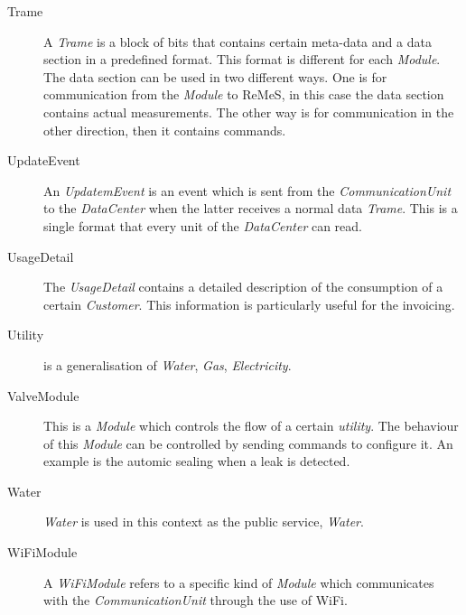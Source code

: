 \begin{description}
\item[Trame] A \emph{Trame} is a block of bits that contains certain meta-data
and a data section in a predefined format. This format is different for each
\emph{Module}. The data section can be used in two different ways. One is for
communication from the \emph{Module} to ReMeS, in this case the data section
contains actual measurements. The other way is for communication in the other
direction, then it contains commands.

\item[UpdateEvent] An \emph{UpdatemEvent} is an event which is sent from the
\emph{CommunicationUnit} to the \emph{DataCenter} when the latter receives a
normal data \emph{Trame}. This is a single format that every unit of the
\emph{DataCenter} can read.

\item[UsageDetail] The \emph{UsageDetail} contains a detailed description of the
consumption of a certain \emph{Customer}. This information is particularly
useful for the invoicing.

\item[Utility] is a generalisation of \emph{Water}, \emph{Gas},
\emph{Electricity}.

\item[ValveModule] This is a \emph{Module} which controls the flow of a certain
\emph{utility}. The behaviour of this \emph{Module} can be controlled by sending
commands to configure it. An example is the automic sealing when a leak is
detected.

\item[Water] \emph{Water} is used in this context as the public service,
\emph{Water}.

\item[WiFiModule] A \emph{WiFiModule} refers to a specific kind of \emph{Module}
which communicates with the \emph{CommunicationUnit} through the use of WiFi.

\end{description}
